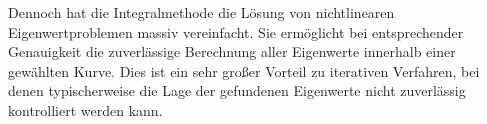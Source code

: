 Dennoch hat die Integralmethode die Lösung von nichtlinearen Eigenwertproblemen massiv vereinfacht.
Sie ermöglicht bei entsprechender Genauigkeit die zuverlässige Berechnung aller Eigenwerte innerhalb einer gewählten Kurve.
Dies ist ein sehr großer Vorteil zu iterativen Verfahren, bei denen typischerweise die Lage der gefundenen Eigenwerte nicht zuverlässig kontrolliert werden kann.